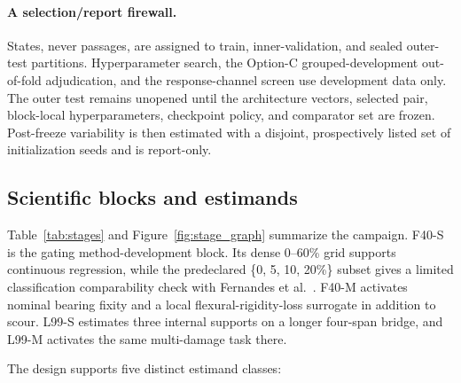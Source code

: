 \paragraph{A selection/report firewall.}
States, never passages, are assigned to train, inner-validation, and sealed
outer-test partitions. Hyperparameter search, the Option-C grouped-development
out-of-fold adjudication, and the response-channel screen use development data
only. The outer test remains unopened until the architecture vectors, selected
pair, block-local hyperparameters, checkpoint policy, and comparator set are
frozen. Post-freeze variability is then estimated with a disjoint,
prospectively listed set of initialization seeds and is report-only.

\subsection{Scientific blocks and estimands}
\label{sec:estimands}

Table~\ref{tab:stages} and Figure~\ref{fig:stage_graph} summarize the campaign.
F40-S is the gating method-development block. Its dense 0--60\% grid supports
continuous regression, while the predeclared \{0, 5, 10, 20\%\} subset gives a
limited classification comparability check with Fernandes et
al.~\cite{fernandes2025early}. F40-M activates nominal bearing fixity and a
local flexural-rigidity-loss surrogate in addition to scour. L99-S estimates
three internal supports on a longer four-span bridge, and L99-M activates the
same multi-damage task there.

The design supports five distinct estimand classes:

